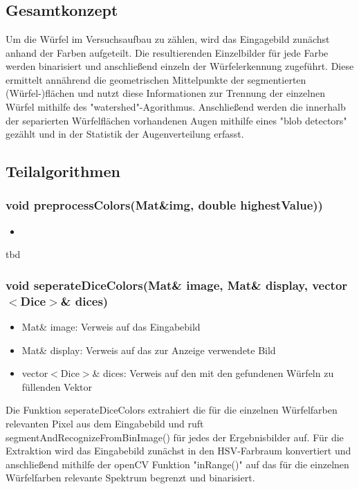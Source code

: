\documentclass{../Vorlage/sebDenCls}
\begin{document}

\section{}
\subsection{Gesamtkonzept}
Um die Würfel im Versuchsaufbau zu zählen, wird das Eingagebild zunächst anhand der Farben aufgeteilt. Die resultierenden Einzelbilder für jede Farbe werden binarisiert und anschließend einzeln der Würfelerkennung zugeführt. Diese ermittelt annährend die geometrischen Mittelpunkte der segmentierten (Würfel-)flächen und nutzt diese Informationen zur Trennung der einzelnen Würfel mithilfe des "watershed"-Agorithmus. Anschließend werden die innerhalb der separierten Würfelflächen vorhandenen Augen mithilfe eines "blob detectors" gezählt und in der Statistik der Augenverteilung erfasst.


\subsection{Teilalgorithmen}

\subsubsection{void preprocessColors(Mat\&img, double highestValue))}
\begin{itemize}
	\item 
\end{itemize}
tbd

\subsubsection{void seperateDiceColors(Mat\& image, Mat\& display, vector $<$Dice$>$\& dices)}
\begin{itemize}
	\item Mat\& image: Verweis auf das Eingabebild
	\item Mat\& display: Verweis auf das zur Anzeige verwendete Bild 
	\item vector$<$Dice$>$\& dices: Verweis auf den mit den gefundenen Würfeln zu füllenden Vektor
\end{itemize}
Die Funktion seperateDiceColors extrahiert die für die einzelnen Würfelfarben relevanten Pixel aus dem Eingabebild und ruft segmentAndRecognizeFromBinImage() für jedes der Ergebnisbilder auf.
Für die Extraktion wird das Eingabebild zunächst in den HSV-Farbraum konvertiert und anschließend mithilfe der openCV Funktion "inRange()" auf das für die einzelnen Würfelfarben relevante Spektrum begrenzt und binarisiert. 
\end{document}
